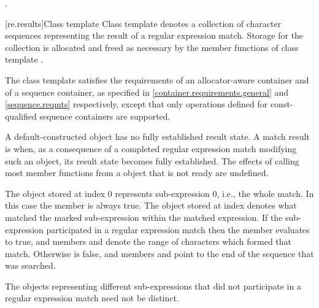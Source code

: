 \begin{itemdescr}
\pnum\returns  {}.
\end{itemdescr}

[re.results]{Class template }
\pnum
{}%
Class template  denotes a collection of character
sequences representing the result of a regular expression
match. Storage for the collection is allocated and freed as necessary
by the member functions of class template .

\pnum
{}%
%
%
The class template  satisfies the requirements of an
allocator-aware container and of a sequence container, as specified
in \ref{container.requirements.general} and \ref{sequence.reqmts} respectively,
except that only operations defined for const-qualified
sequence containers are supported.

\pnum
A default-constructed  object has no fully established result state. A
match result is  when, as a consequence of a completed regular expression match
modifying such an object, its result state becomes fully established. The effects of calling
most member functions from a  object that is not ready are undefined.

\pnum
{}%
The  object stored at index 0 represents sub-expression 0,
i.e., the whole match. In this case the  member
 is always true. The 
object stored at index  denotes what matched the marked
sub-expression  within the matched expression. If the
sub-expression  participated in a regular expression 
match then the  member  evaluates to true, and
members  and  denote the range of characters
 which formed that
match. Otherwise  is false, and members 
and  point to the end of the sequence 
that was searched. \begin{note} The  objects representing
different sub-expressions that did not participate in a regular expression
match need not be distinct.\end{note}

